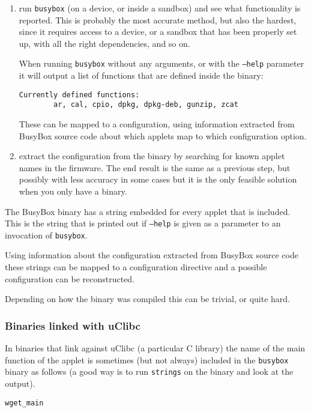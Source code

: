 \documentclass[10pt]{article}
\begin{document}
\begin{enumerate}
\item run \texttt{busybox} (on a device, or inside a sandbox) and see what
functionality is reported. This is probably the most accurate method, but also
the hardest, since it requires access to a device, or a sandbox that has been
properly set up, with all the right dependencies, and so on.

When running \texttt{busybox} without any arguments, or with the \texttt{--help}
parameter it will output a list of functions that are defined inside the
binary:

\begin{verbatim}
Currently defined functions:
        ar, cal, cpio, dpkg, dpkg-deb, gunzip, zcat
\end{verbatim}

These can be mapped to a configuration, using information extracted from
BusyBox source code about which applets map to which configuration option.
\item extract the configuration from the binary by searching for known applet
names in the firmware. The end result is the same as a previous step, but
possibly with less accuracy in some cases but it is the only feasible solution
when you only have a binary.
\end{enumerate}

The BusyBox binary has a string embedded for every applet that is included.
This is the string that is printed out if \texttt{--help} is given as a
parameter to an invocation of \texttt{busybox}.

Using information about the configuration extracted from BusyBox source code
these strings can be mapped to a configuration directive and a possible
configuration can be reconstructed.

Depending on how the binary was compiled this can be trivial, or quite hard.

\subsubsection{Binaries linked with uClibc}

In binaries that link against uClibc (a particular C library) the name of the
main function of the applet is sometimes (but not always) included in the
\texttt{busybox} binary as follows (a good way is to run \texttt{strings} on
the binary and look at the output).

\begin{verbatim}
wget_main
\end{verbatim}
\end{document}
